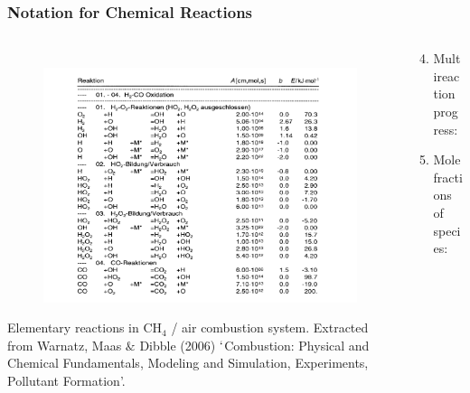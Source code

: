 \documentclass[10pt,compress,handout,unknownkeysallowed]{beamer}
\begin{document}
\begin{frame}
  \frametitle{Notation for Chemical Reactions}
  \begin{columns}
     \begin{column}[l]{0.5\linewidth}\scriptsize
      \begin{figure}%
        \hbox{\hspace{-.2cm}
          \includegraphics[width=1.3\columnwidth,clip]{./../Pics/ChemicalReactions_Reactions}}
      \end{figure}    \scriptsize\vspace{-.5cm}
       Elementary reactions in CH$_{4}$ / air combustion system. Extracted from Warnatz, Maas $\&$ Dibble (2006) $\lq$Combustion: Physical and Chemical Fundamentals, Modeling and Simulation, Experiments, Pollutant Formation'.
     \end{column}
     \begin{column}[l]{0.5\linewidth}%
        \begin{enumerate} \setcounter{enumi}{3}
           \item<1-> Multireaction progress:
           \item<2-> Mole fractions of species:     
        \end{enumerate}
     \end{column}
  \end{columns}
\end{frame}
\normalsize
\end{document}
